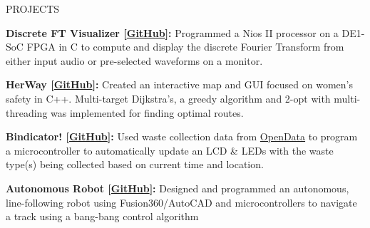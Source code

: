 \documentclass{resume}
\begin{document}

\begin{rSection}{PROJECTS}
\vspace{-1.25em}
\item \textbf{Discrete FT Visualizer [\href{https://github.com/reaahuja/Fourier-Visualizer}{GitHub}]:} {Programmed a Nios II processor on a DE1-SoC FPGA in C to compute and display the discrete Fourier Transform from either input audio or pre-selected waveforms on a monitor.}
\item \textbf{HerWay [\href{https://github.com/endothermiic/her-way}{GitHub}]:} {Created an interactive map and GUI focused on women's safety in C++. Multi-target Dijkstra's, a greedy algorithm and 2-opt with multi-threading was implemented for finding optimal routes.}
\item \textbf{Bindicator! [\href{https://github.com/endothermiic/bindicator}{GitHub}]:} Used waste collection data from \href{https://open.toronto.ca/dataset/solid-waste-pickup-schedule/}{OpenData} to program a microcontroller to automatically update an LCD \& LEDs with the waste type(s) being collected based on current time and location.
\item \textbf{Autonomous Robot [\href{https://github.com/endothermiic/robot}{GitHub}]:} {Designed and programmed an autonomous, line-following robot using Fusion360/AutoCAD and microcontrollers to navigate a track using a bang-bang control algorithm}
 \end{rSection} 
\end{document}
